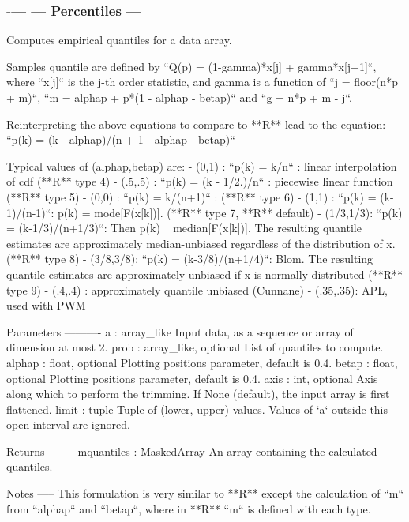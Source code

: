  \subsubsection*{-\/--- --- Percentiles --- }

\begin{DoxyVerb}Computes empirical quantiles for a data array.

Samples quantile are defined by ``Q(p) = (1-gamma)*x[j] + gamma*x[j+1]``,
where ``x[j]`` is the j-th order statistic, and gamma is a function of
``j = floor(n*p + m)``, ``m = alphap + p*(1 - alphap - betap)`` and
``g = n*p + m - j``.

Reinterpreting the above equations to compare to **R** lead to the
equation: ``p(k) = (k - alphap)/(n + 1 - alphap - betap)``

Typical values of (alphap,betap) are:
    - (0,1)    : ``p(k) = k/n`` : linear interpolation of cdf
      (**R** type 4)
    - (.5,.5)  : ``p(k) = (k - 1/2.)/n`` : piecewise linear function
      (**R** type 5)
    - (0,0)    : ``p(k) = k/(n+1)`` :
      (**R** type 6)
    - (1,1)    : ``p(k) = (k-1)/(n-1)``: p(k) = mode[F(x[k])].
      (**R** type 7, **R** default)
    - (1/3,1/3): ``p(k) = (k-1/3)/(n+1/3)``: Then p(k) ~ median[F(x[k])].
      The resulting quantile estimates are approximately median-unbiased
      regardless of the distribution of x.
      (**R** type 8)
    - (3/8,3/8): ``p(k) = (k-3/8)/(n+1/4)``: Blom.
      The resulting quantile estimates are approximately unbiased
      if x is normally distributed
      (**R** type 9)
    - (.4,.4)  : approximately quantile unbiased (Cunnane)
    - (.35,.35): APL, used with PWM

Parameters
----------
a : array_like
    Input data, as a sequence or array of dimension at most 2.
prob : array_like, optional
    List of quantiles to compute.
alphap : float, optional
    Plotting positions parameter, default is 0.4.
betap : float, optional
    Plotting positions parameter, default is 0.4.
axis : int, optional
    Axis along which to perform the trimming.
    If None (default), the input array is first flattened.
limit : tuple
    Tuple of (lower, upper) values.
    Values of `a` outside this open interval are ignored.

Returns
-------
mquantiles : MaskedArray
    An array containing the calculated quantiles.

Notes
-----
This formulation is very similar to **R** except the calculation of
``m`` from ``alphap`` and ``betap``, where in **R** ``m`` is defined
with each type.


\end{DoxyVerb}
